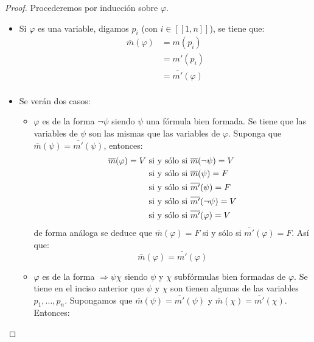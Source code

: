 \documentclass[12pt]{report}
\theoremstyle{largebreak}
\newcommand\natint[1]{\ensuremath{\left[\!\left[ #1\right]\!\right]}}
\begin{document}
    \begin{proof}
        Procederemos por inducción sobre $\varphi$.
        \begin{itemize}
            \item Si $\varphi$ es una variable, digamos $p_i$ (con $i\in\natint{1,n}$), se tiene que:
            \begin{equation*}
                \begin{split}
                    \overline{m}(\varphi)&=m(p_i)\\
                    &=m'(p_i)\\
                    &=\overline{m'}(\varphi)\\
                \end{split}
            \end{equation*}
            \item Se verán dos casos:
            \begin{itemize}
                \item $\varphi$ es de la forma $\neg\psi$ siendo $\psi$ una fórmula bien formada. Se tiene que las variables de $\psi$ son las mismas que las variables de $\varphi$. Suponga que $\overline{m}(\psi)=\overline{m'}(\psi)$, entonces:
                \begin{equation*}
                    \begin{split}
                        \overline{m}(\varphi)=V & \textup{ si y sólo si }\overline{m}(\neg\psi)=V\\
                        &\textup{ si y sólo si }\overline{m}(\psi)=F\\
                        &\textup{ si y sólo si }\overline{m'}(\psi)=F\\
                        &\textup{ si y sólo si }\overline{m'}(\neg\psi)=V\\
                        &\textup{ si y sólo si }\overline{m'}(\varphi)=V\\
                    \end{split}
                \end{equation*}
                de forma análoga se deduce que $\overline{m}(\varphi)=F$ si y sólo si $\overline{m'}(\varphi)=F$. Así que:
                \begin{equation*}
                    \overline{m}(\varphi)=\overline{m'}(\varphi)
                \end{equation*}
                \item $\varphi$ es de la forma $\Rightarrow\psi\chi$ siendo $\psi$ y $\chi$ subfórmulas bien formadas de $\varphi$. Se tiene en el inciso anterior que $\psi$ y $\chi$ son tienen algunas de las variables $p_1,...,p_n$. Supongamos que $\overline{m}(\psi)=\overline{m'}(\psi)$ y $\overline{m}(\chi)=\overline{m'}(\chi)$. Entonces:

\end{itemize}
\end{itemize}
\end{proof}
\end{document}
